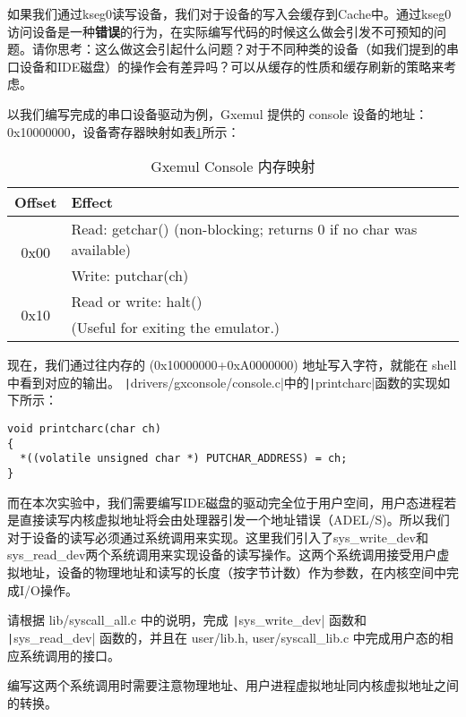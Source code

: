 \begin{thinking}\label{think-fs-cache}

如果我们通过kseg0读写设备，我们对于设备的写入会缓存到Cache中。通过kseg0访问设备是一种\textbf{错误}的行为，在实际编写代码的时候这么做会引发不可预知的问题。请你思考：这么做这会引起什么问题？对于不同种类的设备（如我们提到的串口设备和IDE磁盘）的操作会有差异吗？可以从缓存的性质和缓存刷新的策略来考虑。
\end{thinking}

以我们编写完成的串口设备驱动为例，Gxemul 提供的 console 设备的地址：0x10000000，设备寄存器映射如表\ref{lab5-table-console-mem-map}所示：

\begin{table}[htbp]
\caption{Gxemul Console 内存映射}\label{lab5-table-console-mem-map}
\centering
\begin{tabular}{|c|l|}
  \hline
    Offset & Effect \\
  \hline
  \multirow{2}{*}{0x00} & Read: getchar() (non-blocking; returns 0 if no char was available) \\
  \cline{2-2}
    & Write: putchar(ch) \\
  \hline
    \multirow{2}{*}{0x10} & Read or write: halt() \\
  \cline{2-2}
    & (Useful for exiting the emulator.) \\
  \hline
\end{tabular}
\end{table}

现在，我们通过往内存的 (0x10000000+0xA0000000) 地址写入字符，就能在 shell 中看到对应的输出。
\texttt|drivers/gxconsole/console.c|中的\texttt|printcharc|函数的实现如下所示：

\begin{verbatim}
void printcharc(char ch)
{
  *((volatile unsigned char *) PUTCHAR_ADDRESS) = ch;
}
\end{verbatim}

而在本次实验中，我们需要编写IDE磁盘的驱动完全位于用户空间，用户态进程若是直接读写内核虚拟地址将会由处理器引发一个地址错误（ADEL/S)。所以我们对于设备的读写必须通过系统调用来实现。这里我们引入了sys\_write\_dev和sys\_read\_dev两个系统调用来实现设备的读写操作。这两个系统调用接受用户虚拟地址，设备的物理地址和读写的长度（按字节计数）作为参数，在内核空间中完成I/O操作。

\begin{exercise}
请根据 lib/syscall\_all.c 中的说明，完成 \texttt|sys_write_dev| 函数和 \texttt|sys_read_dev| 函数的，并且在 user/lib.h, user/syscall\_lib.c 中完成用户态的相应系统调用的接口。

编写这两个系统调用时需要注意物理地址、用户进程虚拟地址同内核虚拟地址之间的转换。
\end{exercise}

